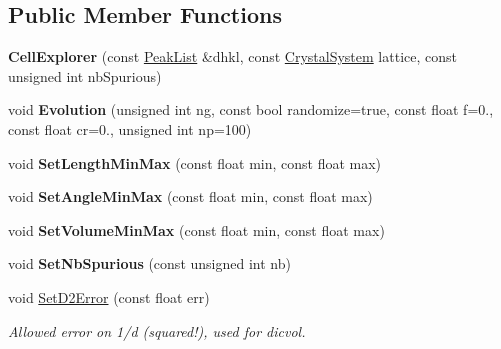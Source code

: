\subsection*{Public Member Functions}
\begin{DoxyCompactItemize}
\item 
\mbox{\label{class_obj_cryst_1_1_cell_explorer_ab5812858db181b2da7793d50a0adf257}} 
{\bfseries Cell\+Explorer} (const \mbox{\hyperlink{class_obj_cryst_1_1_peak_list}{Peak\+List}} \&dhkl, const \mbox{\hyperlink{namespace_obj_cryst_a9cd1d00f4ec9f0e75564ee151f47dd83}{Crystal\+System}} lattice, const unsigned int nb\+Spurious)
\item 
\mbox{\label{class_obj_cryst_1_1_cell_explorer_acef356378502e9c69fe03f92b02c0f36}} 
void {\bfseries Evolution} (unsigned int ng, const bool randomize=true, const float f=0., const float cr=0., unsigned int np=100)
\item 
\mbox{\label{class_obj_cryst_1_1_cell_explorer_a637ca3e27ed5991e56e31c34e675bda3}} 
void {\bfseries Set\+Length\+Min\+Max} (const float min, const float max)
\item 
\mbox{\label{class_obj_cryst_1_1_cell_explorer_a25a18c19322a421c3161b48330260e42}} 
void {\bfseries Set\+Angle\+Min\+Max} (const float min, const float max)
\item 
\mbox{\label{class_obj_cryst_1_1_cell_explorer_a6c729ec9156a394c54880470076e45b5}} 
void {\bfseries Set\+Volume\+Min\+Max} (const float min, const float max)
\item 
\mbox{\label{class_obj_cryst_1_1_cell_explorer_a58cb7aaf7195b6263e4f950a810c0800}} 
void {\bfseries Set\+Nb\+Spurious} (const unsigned int nb)
\item 
\mbox{\label{class_obj_cryst_1_1_cell_explorer_a9f700330603affae619486c0b0a052d5}} 
void \mbox{\hyperlink{class_obj_cryst_1_1_cell_explorer_a9f700330603affae619486c0b0a052d5}{Set\+D2\+Error}} (const float err)
\begin{DoxyCompactList}\small\item\em Allowed error on 1/d (squared!), used for dicvol. \end{DoxyCompactList}\item 

\end{DoxyCompactItemize}
